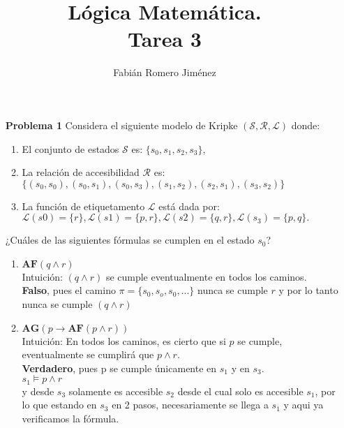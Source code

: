 \documentclass{article}
\title{Lógica Matemática. \\Tarea 3}
\author{Fabián Romero Jiménez}
\date{}
\begin{document}
\lstset{basicstyle=\footnotesize}
\maketitle
\begin{enumerate}

\item[\bf{Problema 1}] Considera el siguiente modelo de Kripke $(\mathcal{S,R,L})$ donde:
\begin{enumerate}
\item El conjunto de estados $\mathcal{S}$ es: $\{s_0, s_1, s_2, s_3\}$,
\item La relación de accesibilidad $\mathcal{R}$ es: $\{(s_0, s_0), (s_0, s_1), (s_0, s_3), (s_1, s_2), (s_2, s_1), (s_3, s_2)\}$
\item La función de etiquetamento $\mathcal{L}$ está dada por: $\mathcal{L}(s0) = \{r\}, \mathcal{L}(s1) = \{p,r\}, \mathcal{L}(s2) = \{q,r\}, \mathcal{L}(s_3) = \{p, q\}.$
\end{enumerate}



¿Cuáles de las siguientes fórmulas se cumplen en el estado $s_0$?
\begin{enumerate}
\item $\mathbf{AF}(q \wedge r)$\\
Intuición: $(q \wedge r)$ se cumple eventualmente en todos los caminos.\\
{\bf Falso}, pues el camino $\pi=\{s_0,s_o,s_0,...\}$ nunca se cumple $r$ y por lo tanto nunca se cumple $(q \wedge r)$

\item $\mathbf{AG}(p \rightarrow \mathbf{AF}(p \wedge r))$\\
Intuición: En todos los caminos, es cierto que si $p$ se cumple, eventualmente se cumplirá que $p \wedge r$.\\
{\bf Verdadero}, pues p se cumple únicamente en $s_1$ y en $s_3$.\\
 $s_1 \models p \wedge r$\\
y desde $s_3$ solamente es accesible $s_2$ desde el cual solo es accesible $s_1$, por lo que estando en $s_3$ en 2 pasos, necesariamente se llega a $s_1$ y aqui ya verificamos la fórmula.


\end{enumerate}
\end{enumerate}
\end{document}
